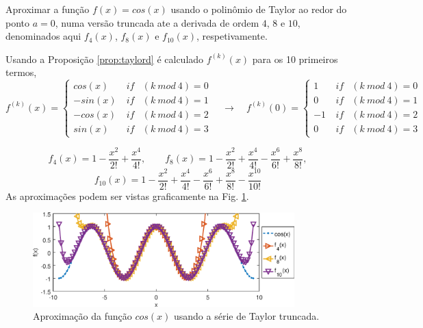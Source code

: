 \begin{example}
Aproximar a função $f(x)=cos(x)$ usando o polinômio de Taylor ao redor do ponto $a=0$,
numa versão truncada ate a derivada de ordem $4$, $8$ e $10$,
denominados aqui $f_4(x)$, $f_8(x)$ e $f_{10}(x)$, respetivamente.
\end{example}
\begin{SolutionT}
Usando a Proposição \ref{prop:taylord} é calculado $f^{(k)}(x)$ para os 10 primeiros termos,
\begin{equation}
f^{(k)}(x)=
\left\{
\begin{matrix}
cos(x) & ~if & (k~mod~4)=0\\
-sin(x)& ~if & (k~mod~4)=1\\
-cos(x)& ~if & (k~mod~4)=2\\
sin(x) & ~if & (k~mod~4)=3
\end{matrix}
\right.
\quad \rightarrow \quad
f^{(k)}(0)=
\left\{
\begin{matrix}
1 & ~if & (k~mod~4)=0\\
0& ~if & (k~mod~4)=1\\
-1& ~if & (k~mod~4)=2\\
0 & ~if & (k~mod~4)=3
\end{matrix}
\right.
\end{equation}

\begin{equation}
f_{4}(x)=
1
-\frac{x^{2}}{2!} 
+\frac{x^{4}}{4!},
\qquad 
f_{8}(x)=
1
-\frac{x^{2}}{2!} 
+\frac{x^{4}}{4!} 
-\frac{x^{6}}{6!} 
+\frac{x^{8}}{8!}, 
\end{equation}
\begin{equation}
f_{10}(x)=
1
-\frac{x^{2}}{2!} 
+\frac{x^{4}}{4!} 
-\frac{x^{6}}{6!} 
+\frac{x^{8}}{8!} 
-\frac{x^{10}}{10!} 
\end{equation}
As aproximações podem ser vistas graficamente na Fig. \ref{fig:taylore}.
\end{SolutionT}

\begin{figure}[!h]
  \centering
    \includegraphics[width=0.90\textwidth]{chapters/funcoes/mcode/taylorR1R1/taylore.eps}
  \caption{Aproximação da função $cos(x)$ usando a série de Taylor truncada.}
    \label{fig:taylore}
\end{figure}
 


